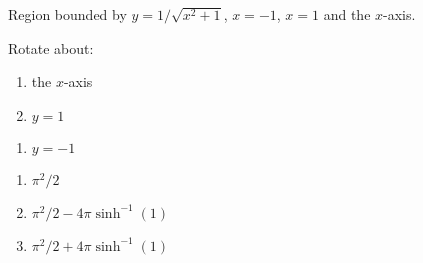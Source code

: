 {Region bounded by $y=1/\sqrt{x^2+1}$, $x=-1$, $x=1$ and the $x$-axis.

Rotate about:

\noindent%
\begin{minipage}[t]{.5\linewidth}
\begin{enumerate}
\item		the $x$-axis
\item		$y=1$
\end{enumerate}
\end{minipage}
\begin{minipage}[t]{.5\linewidth}
\begin{enumerate}\addtocounter{enumii}{2}
\item		$y=-1$
\end{enumerate}
\end{minipage}
}
{\begin{enumerate}
\item $\pi^2/2$
\item $\pi^2/2-4\pi\sinh^{-1} (1)$
\item $\pi^2/2+4\pi\sinh^{-1} (1)$
\end{enumerate}
}
